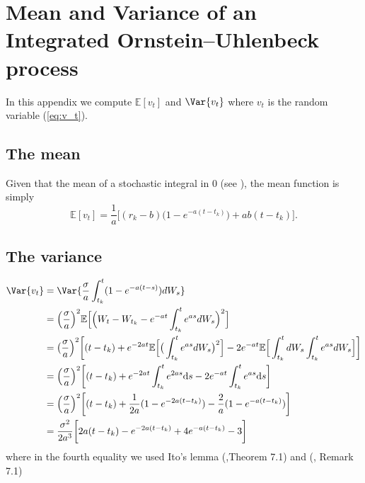 

\chapter{Mean and Variance of an Integrated Ornstein–Uhlenbeck process}\label{app:IntegratedOU}
In this appendix we compute $\mathbb{E}[v_t]$ and $\Var{v_t}$ where $v_t$ is the random variable (\ref{eq:v_t}).
\section{The mean}
Given that the mean of a stochastic integral in 0 (see \cite{baldi2017}), the mean function is simply
\begin{equation}
\mathbb{E}[v_t]= \frac{1}{a}\Big[(r_k - b)\big(1-e^{-a(t-t_k)}\big)+ab(t-t_k)\Big].
\end{equation}


\section{The variance}
\begin{align*}
\nonumber
\Var{v_t} & = \Var{\frac{\sigma}{a}\int_{t_k}^{t}(1-e^{-a(t-s)})dW_s}\\
& = \Big(\frac{\sigma}{a}\Big)^2\mathbb{E}\Big[\Big(W_t-W_{t_k}-e^{-at}\int_{t_k}^{t}e^{as}dW_s\Big)^2\Big]\\
& = \big(\frac{\sigma}{a}\Big)^2\bigg[(t-t_k)+e^{-2at}\mathbb{E}\Big[\big(\int_{t_k}^{t}e^{as}dW_s\big)^2\Big]-2e^{-at}\mathbb{E}\Big[\int_{t_k}^{t}dW_s\int_{t_k}^{t}e^{as}dW_s\Big] \bigg]\\
& = \Big(\frac{\sigma}{a}\Big)^2\bigg[(t-t_k)+e^{-2at}\int_{t_k}^{t}e^{2as}\mathrm{d}s-2e^{-at}\int_{t_k}^{t}e^{as}\mathrm{d}s\bigg]\\
& = \Big(\frac{\sigma}{a}\Big)^2\bigg[(t-t_k)+\frac{1}{2a}(1-e^{-2a(t-t_k)})-\frac{2}{a}(1-e^{-a(t-t_k)})\bigg] \\
& = \frac{\sigma^2}{2a^3}\bigg[2a(t-t_k)-e^{-2a(t-t_k)}+4e^{-a(t-t_k)}-3\bigg]
\end{align*}
where in the fourth equality we used Ito's lemma (\cite{baldi2017},Theorem 7.1) and (\cite{baldi2017}, Remark 7.1)

